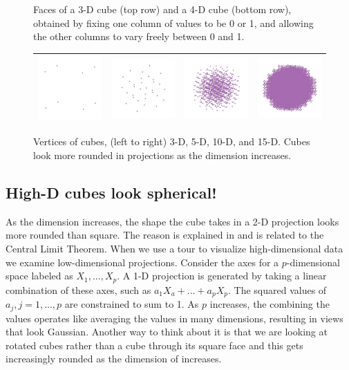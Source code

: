 \begin{figure}[ht]
  \caption{Faces of a 3-D cube (top row) and a 4-D cube (bottom row), obtained by fixing one column of values to be 0 or 1, and allowing the other columns to vary freely between 0 and 1.}
  \label{faces}
\end{figure}

\begin{figure}[ht]
\centering
\begin{tabular}{|c|c|c|c|}
\hline
\includegraphics[width=1in]{fig/cube-3-vert.pdf} & \includegraphics[width=1in]{fig/cube-5-vert.pdf} &
\includegraphics[width=1in]{fig/cube-10-vert.pdf} & \includegraphics[width=1in]{fig/cube-15-vert.pdf} \\
\hline
\end{tabular}
\caption{Vertices of cubes, (left to right) 3-D, 5-D, 10-D, and 15-D. Cubes look more
  rounded in projections as the dimension increases.}
\end{figure}

\subsection{High-D cubes look spherical!}

As the dimension increases, the shape the cube takes in a 2-D
projection looks more rounded than square. The reason is explained in
\citet{DF84} and is related to the Central Limit Theorem. When we use
a tour to visualize high-dimensional data we examine low-dimensional
projections.  Consider the axes for a $p$-dimensional space labeled as
$X_1, ..., X_p$. A 1-D projection is generated by taking a linear
combination of these axes, such as $a_1X_a+...+a_pX_p$. The squared
values of $a_j, j=1, ..., p$ are constrained to sum to 1. As $p$
increases, the combining the values operates like averaging the values
in many dimensions, resulting in views that look Gaussian. Another way
to think about it is that we are looking at rotated cubes rather than
a cube through its square face and this gets increasingly rounded as
the dimension of increases.



